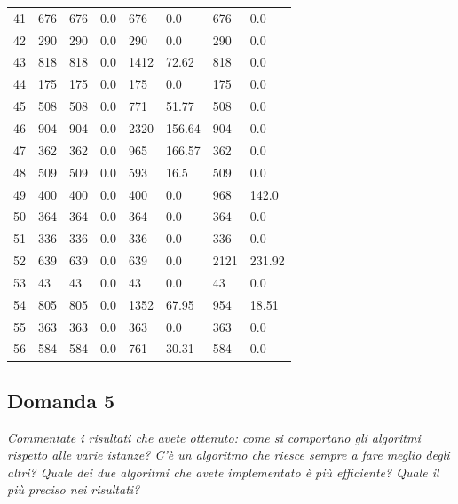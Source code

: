 \begin{longtable}{llllllll}
	41 & 676 & 676 & 0.0 & 676 & 0.0 & 676 & 0.0 \\
	42 & 290 & 290 & 0.0 & 290 & 0.0 & 290 & 0.0 \\
	43 & 818 & 818 & 0.0 & 1412 & 72.62 & 818 & 0.0 \\
	44 & 175 & 175 & 0.0 & 175 & 0.0 & 175 & 0.0 \\
	45 & 508 & 508 & 0.0 & 771 & 51.77 & 508 & 0.0 \\
	46 & 904 & 904 & 0.0 & 2320 & 156.64 & 904 & 0.0 \\
	47 & 362 & 362 & 0.0 & 965 & 166.57 & 362 & 0.0 \\
	48 & 509 & 509 & 0.0 & 593 & 16.5 & 509 & 0.0 \\
	49 & 400 & 400 & 0.0 & 400 & 0.0 & 968 & 142.0 \\
	50 & 364 & 364 & 0.0 & 364 & 0.0 & 364 & 0.0 \\
	51 & 336 & 336 & 0.0 & 336 & 0.0 & 336 & 0.0 \\
	52 & 639 & 639 & 0.0 & 639 & 0.0 & 2121 & 231.92 \\
	53 & 43 & 43 & 0.0 & 43 & 0.0 & 43 & 0.0 \\
	54 & 805 & 805 & 0.0 & 1352 & 67.95 & 954 & 18.51 \\
	55 & 363 & 363 & 0.0 & 363 & 0.0 & 363 & 0.0 \\
	56 & 584 & 584 & 0.0 & 761 & 30.31 & 584 & 0.0
	\end{longtable}

\subsection{Domanda 5}
\textit{Commentate i risultati che avete ottenuto: come si comportano gli algoritmi rispetto alle varie istanze? C'è un algoritmo che riesce sempre a fare meglio degli altri? Quale dei due algoritmi che avete implementato è più efficiente? Quale il più preciso nei risultati?}

